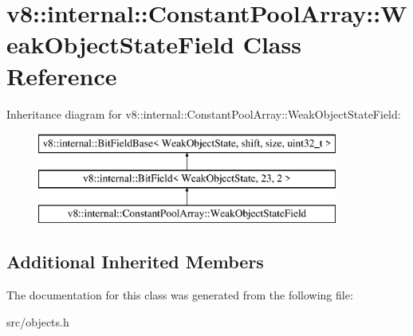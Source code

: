 \hypertarget{classv8_1_1internal_1_1_constant_pool_array_1_1_weak_object_state_field}{}\section{v8\+:\+:internal\+:\+:Constant\+Pool\+Array\+:\+:Weak\+Object\+State\+Field Class Reference}
\label{classv8_1_1internal_1_1_constant_pool_array_1_1_weak_object_state_field}
Inheritance diagram for v8\+:\+:internal\+:\+:Constant\+Pool\+Array\+:\+:Weak\+Object\+State\+Field\+:\begin{figure}[H]
\begin{center}
\leavevmode
\includegraphics[height=3.000000cm]{classv8_1_1internal_1_1_constant_pool_array_1_1_weak_object_state_field}
\end{center}
\end{figure}
\subsection*{Additional Inherited Members}


The documentation for this class was generated from the following file\+:\begin{DoxyCompactItemize}
\item 
src/objects.\+h\end{DoxyCompactItemize}
